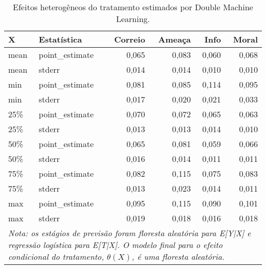 \begin{table}
\centering
\caption{Efeitos heterogêneos do tratamento estimados por Double Machine Learning.}
\label{tab:dml-summary}
\begin{tabular}{llrrrr}
\toprule
    X &     Estatística &  Correio &  Ameaça &   Info &  Moral \\
\midrule
 mean &  point\_estimate &    0,065 &   0,083 &  0,060 &  0,068 \\
 mean &          stderr &    0,014 &   0,014 &  0,010 &  0,010 \\
  min &  point\_estimate &    0,081 &   0,085 &  0,114 &  0,095 \\
  min &          stderr &    0,017 &   0,020 &  0,021 &  0,033 \\
  25\% &  point\_estimate &    0,070 &   0,072 &  0,065 &  0,063 \\
  25\% &          stderr &    0,013 &   0,013 &  0,014 &  0,010 \\
  50\% &  point\_estimate &    0,065 &   0,081 &  0,059 &  0,066 \\
  50\% &          stderr &    0,016 &   0,014 &  0,011 &  0,011 \\
  75\% &  point\_estimate &    0,082 &   0,115 &  0,075 &  0,083 \\
  75\% &          stderr &    0,013 &   0,023 &  0,014 &  0,011 \\
  max &  point\_estimate &    0,095 &   0,115 &  0,090 &  0,101 \\
  max &          stderr &    0,019 &   0,018 &  0,016 &  0,018 \\
\bottomrule
\multicolumn{6}{l}{\emph{Nota: os estágios de previsão foram floresta aleatória para E[Y|X]
e regressão logística para E[T|X]. O modelo final para o efeito 
condicional do tratamento, $\theta(X)$, é uma floresta aleatória.}}\\
\end{tabular}
\end{table}
